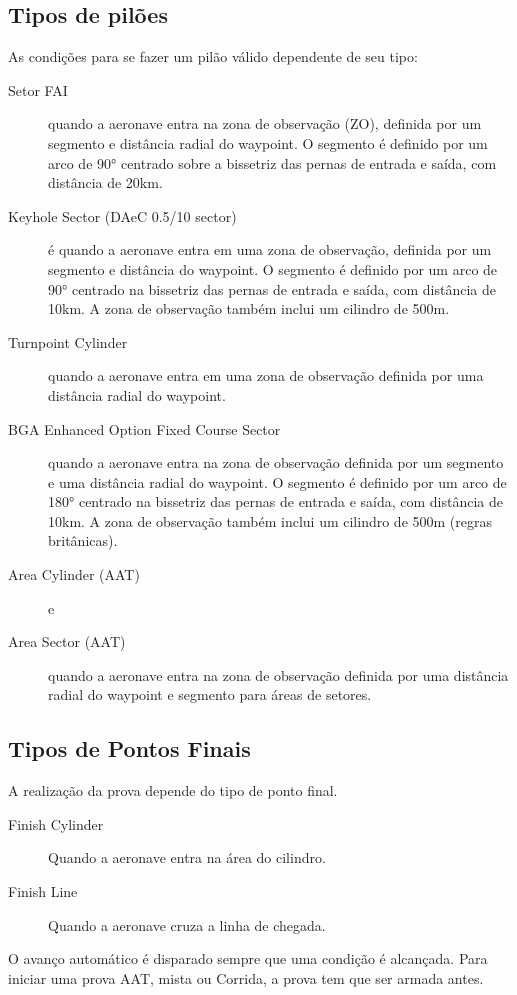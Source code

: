 \subsection*{Tipos de pilões}
As condições para se fazer um pilão válido dependente de seu tipo:
\begin{description}
\item[Setor FAI] quando a aeronave entra na zona de observação (ZO), definida por um segmento e distância radial do waypoint.  O segmento é definido por um arco de 90° centrado sobre a bissetriz das pernas de entrada e saída, com distância de 20km.  
\item[Keyhole Sector (DAeC 0.5/10 sector)] é quando a aeronave entra em uma zona de observação, definida por um segmento e distância do waypoint. O segmento é definido por um arco de 90° centrado na bissetriz das pernas de entrada e saída, com distância de 10km.  A zona de observação também inclui um cilindro de 500m.
\item[Turnpoint Cylinder]  quando a aeronave entra em uma zona de observação definida por uma distância radial do waypoint.
\item[BGA Enhanced Option Fixed Course Sector]  quando a aeronave entra na zona de observação definida por um segmento e uma distância radial do waypoint.  O segmento é definido por um arco de 180° centrado na bissetriz das pernas de entrada e saída, com distância de 10km.  A zona de observação também inclui um cilindro de 500m (regras britânicas).
\item[Area Cylinder (AAT)]  e
\item[Area Sector (AAT)]  quando a aeronave entra na zona de observação definida por uma distância radial do waypoint e segmento para áreas de setores.

\end{description}

\subsection*{Tipos de Pontos Finais}
A realização da prova depende do tipo de ponto final.
\begin{description}
\item[Finish Cylinder] Quando a aeronave entra na área do cilindro.
\item[Finish Line] Quando a aeronave cruza a linha de chegada.
\end{description}

O avanço automático é disparado sempre que uma condição é alcançada.  Para iniciar uma prova AAT, mista ou Corrida, a prova tem que ser armada antes.

